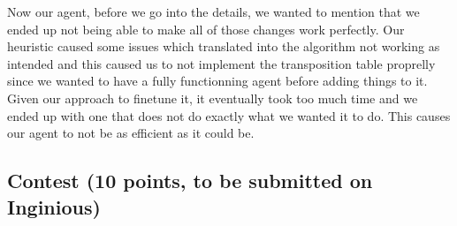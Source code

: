 \documentclass[11pt,a4paper]{report}
\begin{document}
\begin{answers}[23cm]
    Now our agent, before we go into the details, we wanted to mention that we ended up not being able to make all of those changes work perfectly. 
    Our heuristic caused some issues which translated into the algorithm not working as intended and this caused us to not implement the transposition 
    table proprelly since we wanted to have a fully functionning agent before adding things to it. Given our approach to finetune it, it eventually took 
    too much time and we ended up with one that does not do exactly what we wanted it to do. This causes our agent to not be as efficient as it could be.
\end{answers}


\subsection{Contest (10 points, to be submitted on Inginious)}
\end{document}
